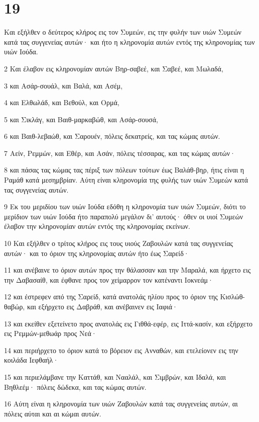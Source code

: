 \chapter{19}

\par Και εξήλθεν ο δεύτερος κλήρος εις τον Συμεών, εις την φυλήν των υιών Συμεών κατά τας συγγενείας αυτών· και ήτο η κληρονομία αυτών εντός της κληρονομίας των υιών Ιούδα.
\par 2 Και έλαβον εις κληρονομίαν αυτών Βηρ-σαβεέ, και Σαβεέ, και Μωλαδά,
\par 3 και Ασάρ-σουάλ, και Βαλά, και Ασέμ,
\par 4 και Ελθωλάδ, και Βεθούλ, και Ορμά,
\par 5 και Σικλάγ, και Βαιθ-μαρκαβώθ, και Ασάρ-σουσά,
\par 6 και Βαιθ-λεβαώθ, και Σαρουέν, πόλεις δεκατρείς, και τας κώμας αυτών.
\par 7 Αείν, Ρεμμών, και Εθέρ, και Ασάν, πόλεις τέσσαρας, και τας κώμας αυτών·
\par 8 και πάσας τας κώμας τας πέριξ των πόλεων τούτων έως Βαλάθ-βηρ, ήτις είναι η Ραμάθ κατά μεσημβρίαν. Αύτη είναι κληρονομία της φυλής των υιών Συμεών κατά τας συγγενείας αυτών.
\par 9 Εκ του μεριδίου των υιών Ιούδα εδόθη η κληρονομία των υιών Συμεών, διότι το μερίδιον των υιών Ιούδα ήτο παραπολύ μεγάλον δι' αυτούς· όθεν οι υιοί Συμεών έλαβον την κληρονομίαν αυτών εντός της κληρονομίας εκείνων.
\par 10 Και εξήλθεν ο τρίτος κλήρος εις τους υιούς Ζαβουλών κατά τας συγγενείας αυτών· και το όριον της κληρονομίας αυτών ήτο έως Σαρείδ·
\par 11 και ανέβαινε το όριον αυτών προς την θάλασσαν και την Μαραλά, και ήρχετο εις την Δαβασαίθ, και έφθανε προς τον χείμαρρον τον κατέναντι Ιοκνεάμ·
\par 12 και έστρεφεν από της Σαρείδ, κατά ανατολάς ηλίου προς το όριον της Κισλώθ-θαβώρ, και εξήρχετο εις Δαβράθ, και ανέβαινεν εις Ιαφιά·
\par 13 και εκείθεν εξετείνετο προς ανατολάς εις Γιθθά-εφέρ, εις Ιττά-κασίν, και εξήρχετο εις Ρεμμών-μεθωάρ προς Νεά·
\par 14 και περιήρχετο το όριον κατά το βόρειον εις Ανναθών, και ετελείονεν εις την κοιλάδα Ιεφθαήλ·
\par 15 και περιελάμβανε την Καττάθ, και Νααλάλ, και Σιμβρών, και Ιδαλά, και Βηθλεέμ· πόλεις δώδεκα, και τας κώμας αυτών.
\par 16 Αύτη είναι η κληρονομία των υιών Ζαβουλών κατά τας συγγενείας αυτών, αι πόλεις αύται και αι κώμαι αυτών.
